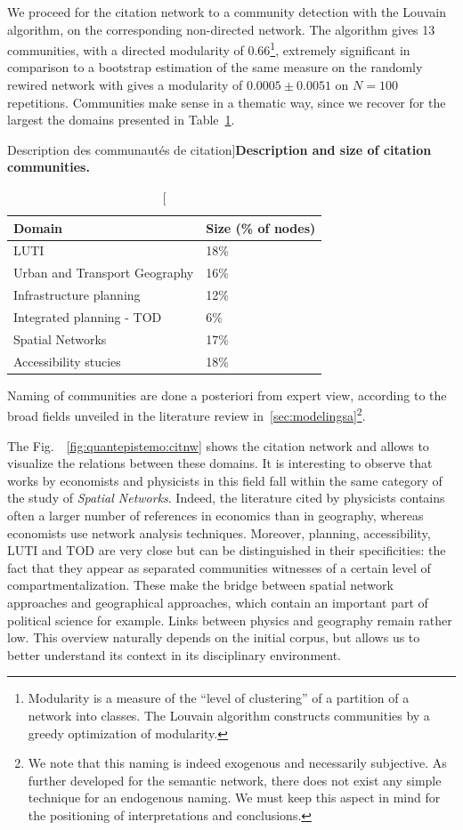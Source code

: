 \documentclass[galley]{jtlu-article-2col}
\begin{document}
We proceed for the citation network to a community detection with the Louvain algorithm, on the corresponding non-directed network. The algorithm gives 13 communities, with a directed modularity of 0.66\footnote{Modularity is a measure of the ``level of clustering'' of a partition of a network into classes. The Louvain algorithm constructs communities by a greedy optimization of modularity.}, extremely significant in comparison to a bootstrap estimation of the same measure on the randomly rewired network with gives a modularity of $0.0005 \pm 0.0051$ on $N=100$ repetitions. Communities make sense in a thematic way, since we recover for the largest the domains presented in Table~\ref{tab:quantepistemo:citation}.

\begin{table}
\caption[Description of citation communities][Description des communautés de citation]{\textbf{Description and size of citation communities.}\label{tab:quantepistemo:citation}}
\begin{tabular}{|l|l|}
\hline
	Domain & Size (\% of nodes)\\\hline
	LUTI & 18\% \\\hline
	Urban and Transport Geography & 16\% \\\hline
	Infrastructure planning & 12\% \\\hline
	Integrated planning - TOD & 6\% \\\hline
	Spatial Networks & 17\% \\\hline
	Accessibility stucies & 18\% \\\hline
\end{tabular}
\end{table}


Naming of communities are done a posteriori from expert view, according to the broad fields unveiled in the literature review in~\ref{sec:modelingsa}\footnote{We note that this naming is indeed exogenous and necessarily subjective. As further developed for the semantic network, there does not exist any simple technique for an endogenous naming. We must keep this aspect in mind for the positioning of interpretations and conclusions.}.

The Fig.~~\ref{fig:quantepistemo:citnw} shows the citation network and allows to visualize the relations between these domains. It is interesting to observe that works by economists and physicists in this field fall within the same category of the study of \emph{Spatial Networks}. Indeed, the literature cited by physicists contains often a larger number of references in economics than in geography, whereas economists use network analysis techniques. Moreover, planning, accessibility, LUTI and TOD are very close but can be distinguished in their specificities: the fact that they appear as separated communities witnesses of a certain level of compartmentalization. These make the bridge between spatial network approaches and geographical approaches, which contain an important part of political science for example. Links between physics and geography remain rather low. This overview naturally depends on the initial corpus, but allows us to better understand its context in its disciplinary environment.
\end{document}
